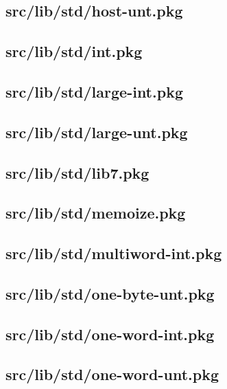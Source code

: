 \subsection{src/lib/std/host-unt.pkg}


\subsection{src/lib/std/int.pkg}


\subsection{src/lib/std/large-int.pkg}


\subsection{src/lib/std/large-unt.pkg}


\subsection{src/lib/std/lib7.pkg}


\subsection{src/lib/std/memoize.pkg}


\subsection{src/lib/std/multiword-int.pkg}


\subsection{src/lib/std/one-byte-unt.pkg}


\subsection{src/lib/std/one-word-int.pkg}


\subsection{src/lib/std/one-word-unt.pkg}


